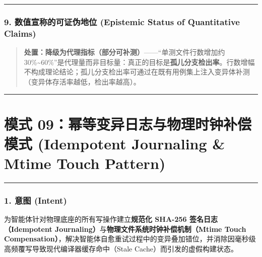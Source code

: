 \begin{Shaded}
\begin{Highlighting}[]
    \KeywordTok{=\textgreater{}} \OperatorTok{!}\NormalTok{)}\OperatorTok{;}
\NormalTok{  \}}
\NormalTok{\}}
\end{Highlighting}
\end{Shaded}

\begin{center}\rule{0.5\linewidth}{0.5pt}\end{center}

\subsubsection{9. 数值宣称的可证伪地位 (Epistemic Status of Quantitative
Claims)}\label{ux6570ux503cux5ba3ux79f0ux7684ux53efux8bc1ux4f2aux5730ux4f4d-epistemic-status-of-quantitative-claims-3}

\begin{quote}
\textbf{处置：降级为代理指标（部分可补测）}------``单测文件行数增加约
30\%\textasciitilde60\%''是代理量而非目标量：真正的目标是\textbf{孤儿分支检出率}。行数增幅不构成理论结论；孤儿分支检出率可通过在既有用例集上注入变异体补测（变异体存活率越低，检出率越高）。
\end{quote}

\begin{center}\rule{0.5\linewidth}{0.5pt}\end{center}

\section{模式 09：幂等变异日志与物理时钟补偿模式 (Idempotent Journaling
\& Mtime Touch
Pattern)}\label{ux6a21ux5f0f-09ux5e42ux7b49ux53d8ux5f02ux65e5ux5fd7ux4e0eux7269ux7406ux65f6ux949fux8865ux507fux6a21ux5f0f-idempotent-journaling-mtime-touch-pattern}

\begin{center}\rule{0.5\linewidth}{0.5pt}\end{center}

\subsubsection{1. 意图 (Intent)}\label{ux610fux56fe-intent-8}

为智能体针对物理底座的所有写操作建立\textbf{规范化 SHA-256
签名日志（Idempotent
Journaling）}与\textbf{物理文件系统时钟补偿机制（Mtime Touch
Compensation）}，解决智能体自愈重试过程中的变异叠加错位，并消除因毫秒级高频覆写导致现代编译器缓存命中（Stale
Cache）而引发的虚假构建状态。

